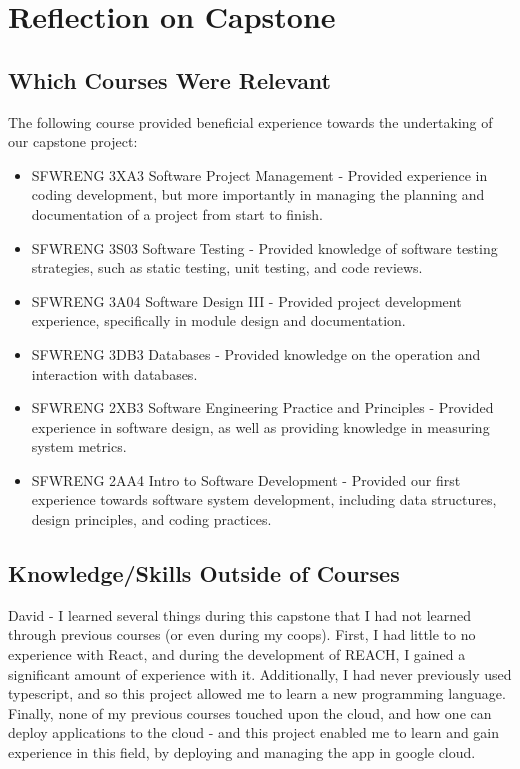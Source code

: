 \documentclass{article}
\begin{document}
\section{Reflection on Capstone}


\subsection{Which Courses Were Relevant}

The following course provided beneficial experience towards the undertaking of our capstone project:
\begin{itemize}
	\item SFWRENG 3XA3 Software Project Management - Provided experience in coding development, but more importantly in managing the planning and documentation of a project from start to finish.
	\item SFWRENG 3S03 Software Testing - Provided knowledge of software testing strategies, such as static testing, unit testing, and code reviews.
	\item SFWRENG 3A04 Software Design III - Provided project development experience, specifically in module design and documentation.
	\item SFWRENG 3DB3 Databases - Provided knowledge on the operation and interaction with databases.
	\item SFWRENG 2XB3 Software Engineering Practice and Principles - Provided experience in software design, as well as providing knowledge in measuring system metrics.
	\item SFWRENG 2AA4 Intro to Software Development - Provided our first experience towards software system development, including data structures, design principles, and coding practices.
\end{itemize}

\subsection{Knowledge/Skills Outside of Courses}


    David - I learned several things during this capstone that I had not learned through previous courses (or even during my coops). First, 
    I had little to no experience with React, and during the development of REACH, I gained a significant amount of experience with it. Additionally,
    I had never previously used typescript, and so this project allowed me to learn a new programming language. Finally, none of my previous 
    courses touched upon the cloud, and how one can deploy applications to the cloud - and this project enabled me to learn and gain experience in this 
    field, by deploying and managing the app in google cloud.\\
\end{document}
